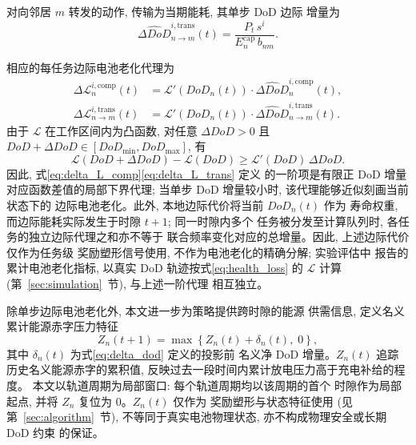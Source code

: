 \documentclass[a4paper,11pt]{article}
\begin{document}
对向邻居 $m$ 转发的动作, 传输为当期能耗, 其单步 DoD 边际
增量为
\begin{equation}
    \widehat{\Delta DoD}^{i,\mathrm{trans}}_{n \to m}(t)
    = \frac{P_t\, s^i}{E^{\mathrm{cap}}_n\, b_{nm}}.
    \label{eq:delta_dod_trans_task}
\end{equation}

相应的每任务边际电池老化代理为
\begin{align}
    \Delta\mathcal{L}^{i,\mathrm{comp}}_n(t)
    &= \mathcal{L}'(DoD_n(t)) \cdot 
    \widehat{\Delta DoD}^{i,\mathrm{comp}}_n(t),
    \label{eq:delta_L_comp}\\
    \Delta\mathcal{L}^{i,\mathrm{trans}}_{n \to m}(t)
    &= \mathcal{L}'(DoD_n(t)) \cdot 
    \widehat{\Delta DoD}^{i,\mathrm{trans}}_{n \to m}(t).
    \label{eq:delta_L_trans}
\end{align}
由于 $\mathcal{L}$ 在工作区间内为凸函数, 对任意
$\Delta DoD > 0$ 且 $DoD + \Delta DoD \in [DoD_{\min}, DoD_{\max}]$,
有
\begin{equation}
    \mathcal{L}(DoD + \Delta DoD) - \mathcal{L}(DoD)
    \ge \mathcal{L}'(DoD)\, \Delta DoD.
    \label{eq:convex_lower_bound}
\end{equation}
因此, 式\eqref{eq:delta_L_comp}\eqref{eq:delta_L_trans} 定义
的一阶项是有限正 DoD 增量对应函数差值的局部下界代理; 
当单步 DoD 增量较小时, 该代理能够近似刻画当前状态下的
边际电池老化。此外, 本地边际代价将当前 $DoD_n(t)$ 作为
寿命权重, 而边际能耗实际发生于时隙 $t+1$; 同一时隙内多个
任务被分发至计算队列时, 各任务的独立边际代理之和亦不等于
联合频率变化对应的总增量。因此, 上述边际代价仅作为任务级
奖励塑形信号使用, 不作为电池老化的精确分解; 实验评估中
报告的累计电池老化指标, 以真实 DoD 轨迹按式\eqref{eq:health_loss}
的 $\mathcal{L}$ 计算 (第~\ref{sec:simulation}~节), 与上述一阶代理
相互独立。

除单步边际电池老化外, 本文进一步为策略提供跨时隙的能源
供需信息, 定义名义累计能源赤字压力特征
\begin{equation}
    Z_n(t+1) = \max\left\{Z_n(t) + \delta_n(t),\; 0\right\},
    \label{eq:virtual_queue}
\end{equation}
其中 $\delta_n(t)$ 为式\eqref{eq:delta_dod} 定义的投影前
名义净 DoD 增量。$Z_n(t)$ 追踪历史名义能源赤字的累积值,
反映过去一段时间内累计放电压力高于充电补给的程度。
本文以轨道周期为局部窗口: 每个轨道周期均以该周期的首个
时隙作为局部起点, 并将 $Z_n$ 复位为 $0$。$Z_n(t)$ 仅作为
奖励塑形与状态特征使用 (见第~\ref{sec:algorithm}~节),
不等同于真实电池物理状态, 亦不构成物理安全或长期 DoD 约束
的保证。
\end{document}
